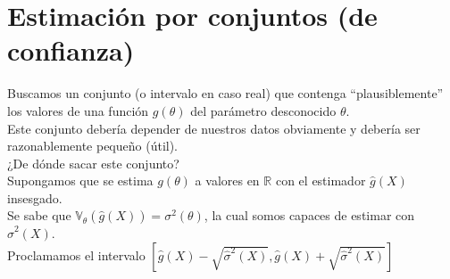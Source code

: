 \documentclass[10pt]{article}
\theoremstyle{plain}
\theoremstyle{definition}
\begin{document}
\section{Estimación por conjuntos (de confianza)}
Buscamos un conjunto (o intervalo en caso real) que contenga ``plausiblemente'' los valores de una función $g(\theta)$ del parámetro desconocido $\theta$.\\
Este conjunto debería depender de nuestros datos obviamente y debería ser razonablemente pequeño (útil).\\
¿De dónde sacar este conjunto?\\
Supongamos que se estima $g(\theta)$ a valores en $\mathbb{R}$ con el estimador $\hat{g}(X)$ insesgado.\\
Se sabe que $\mathbb{V}_{\theta}(\hat{g}(X)) = \sigma^2(\theta)$, la cual somos capaces de estimar con $\hat{\sigma}^2(X)$.\\
Proclamamos el intervalo $[\hat{g}(X)- \sqrt{\hat{\sigma}^2(X)}, \hat{g}(X)+ \sqrt{\hat{\sigma}^2(X)}]$
\end{document}
